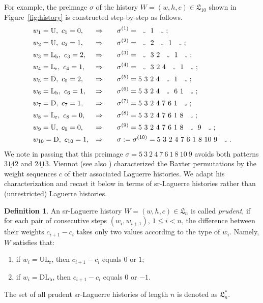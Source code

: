 \documentclass[12pt,reqno]{amsart}
\numberwithin{equation}{section}
\theoremstyle{plain}
\theoremstyle{definition}
\newtheorem{Def}[theorem]{Definition}
\def\rU{\operatorname{U}}
\def\rD{\operatorname{D}}
\def\rLr{\operatorname{L_r}}
\def\rLb{\operatorname{L_b}}
\def\ULr{\operatorname{UL_r}}
\def\DLb{\operatorname{DL_b}}
\def\LH{\mathfrak{L}}
\newcommand\varspace[1][.7em]{
  \makebox[#1]{
    \kern.07em
    \vrule height.3ex
    \hrulefill
    \vrule height.3ex
    \kern.07em
  }
}
\begin{document}
For example, the preimage $\sigma$ of the history $W=(w,h,c)\in\LH_{10}$ shown in Figure~\ref{fig:history} is constructed step-by-step as follows. 
\begin{align*}
&w_1=\rU,~c_1=0, & \Rightarrow \qquad & \sigma^{(1)}= \text{\varspace~$1$~\varspace}; \\
&w_2=\rU,~c_2=1, & \Rightarrow \qquad & \sigma^{(2)}= \text{\varspace~$2$~\varspace~$1$~\varspace}; \\
&w_3=\rLb,~c_3=2, & \Rightarrow \qquad & \sigma^{(3)}= \text{\varspace~$3~2$~\varspace~$1$~\varspace}; \\
&w_4=\rLr,~c_4=1, & \Rightarrow \qquad & \sigma^{(4)}= \text{\varspace~$3~2~4$~\varspace~$1$~\varspace}; \\
&w_5=\rD,~c_5=2, & \Rightarrow \qquad & \sigma^{(5)}= \text{$5~3~2~4$~\varspace~$1$~\varspace}; \\
&w_6=\rLb,~c_6=1, & \Rightarrow \qquad & \sigma^{(6)}= \text{$5~3~2~4$~\varspace~$6~1$~\varspace}; \\
&w_7=\rD,~c_7=1, & \Rightarrow \qquad & \sigma^{(7)}= \text{$5~3~2~4~7~6~1$~\varspace}; \\
&w_8=\rLr,~c_8=0, & \Rightarrow \qquad & \sigma^{(8)}= \text{$5~3~2~4~7~6~1~8$~\varspace}; \\
&w_9=\rU,~c_9=0, & \Rightarrow \qquad & \sigma^{(9)}= \text{$5~3~2~4~7~6~1~8$~\varspace~$9$~\varspace}; \\
&w_{10}=\rD,~c_{10}=1, & \Rightarrow \qquad & \sigma:=\sigma^{(10)}= \text{$5~3~2~4~7~6~1~8~10~9$~\varspace}.
\end{align*}
We note in passing that this preimage $\sigma = 5~3~2~4~7~6~1~8~10~9$ avoids both patterns $3\underline{14}2$ and $2\underline{41}3$. Viennot \cite{Vi81} (see also \cite[Chapter 4b]{ABjC}) characterized the Baxter permutations by the weight sequences $c$ of their associated Laguerre histories. We adapt his characterization and recast it below in terms of sr-Laguerre histories rather than (unrestricted) Laguerre histories.

\begin{Def}\label{def:prudent}
An sr-Laguerre history $W=(w,h,c)\in\LH_n$ is called \emph{prudent}, if for each pair of consecutive steps $(w_i,w_{i+1})$, $1\le i<n$, the difference between their weights $c_{i+1}-c_{i}$ takes only two values according to the type of $w_i$. Namely, $W$ satisfies that:
\begin{enumerate}
  \item if $w_i=\ULr$, then $c_{i+1}-c_i$ equals $0$ or $1$;
  \item if $w_i=\DLb$, then $c_{i+1}-c_i$ equals $0$ or $-1$.
\end{enumerate}
The set of all prudent sr-Laguerre histories of length $n$ is denoted as $\LH^*_n$.
\end{Def}
\end{document}
